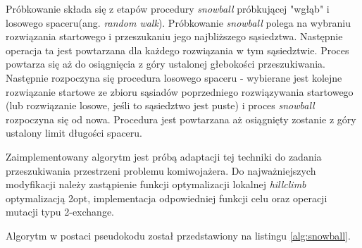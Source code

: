 Próbkowanie składa się z etapów procedury \textit{snowball} próbkującej "wgłąb" i losowego spaceru(ang. \textit{random walk}).
Próbkowanie \textit{snowball} polega na wybraniu rozwiązania startowego i przeszukaniu jego najbliższego sąsiedztwa.
Następnie operacja ta jest powtarzana dla każdego rozwiązania w tym sąsiedztwie. Proces powtarza się aż do osiągnięcia z góry ustalonej głebokości
przeszukiwania. Następnie rozpoczyna się procedura losowego spaceru - wybierane jest kolejne rozwiązanie startowe
ze zbioru sąsiadów poprzedniego rozwiązywania startowego (lub rozwiązanie losowe, jeśli to sąsiedztwo jest puste) i proces \textit{snowball}
rozpoczyna się od nowa. Procedura jest powtarzana aż osiągnięty zostanie z góry ustalony limit długości spaceru.

Zaimplementowany algorytm jest próbą adaptacji tej techniki do zadania przeszukiwania przestrzeni
problemu komiwojażera. Do najważniejszych modyfikacji należy zastąpienie funkcji optymalizacji lokalnej \textit{hillclimb}
optymalizacją 2opt, implementacja odpowiedniej funkcji celu oraz operacji mutacji typu 2-exchange.

Algorytm w postaci pseudokodu został przedstawiony na listingu \ref{alg:snowball}.

\vspace{1em}

